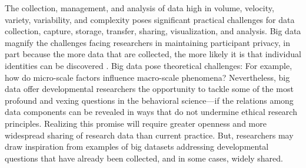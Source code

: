\documentclass[letterpaper,man,apacite,natbib]{apa6}
\begin{document}
The collection, management, and analysis of data high in volume, velocity, variety, variability, and complexity poses significant practical challenges for data collection, capture, storage, transfer, sharing, visualization, and analysis.
Big data magnify the challenges facing researchers in maintaining participant privacy, in part because the more data that are collected, the more likely it is that individual identities can be discovered \cite{sweeney_identifiability}.
Big data pose theoretical challenges: For example, how do micro-scale factors influence macro-scale phenomena?
Nevertheless, big data offer developmental researchers the opportunity to tackle some of the most profound and vexing questions in the behavioral science---if the relations among data components can be revealed in ways that do not undermine ethical research principles.
Realizing this promise will require greater openness and more widespread sharing of research data than current practice.
But, researchers may draw inspiration from examples of big datasets addressing developmental questions that have already been collected, and in some cases, widely shared.
\end{document}
